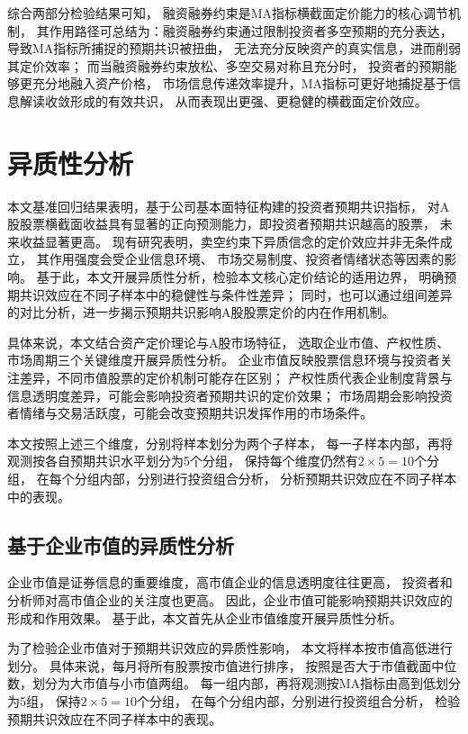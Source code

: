 综合两部分检验结果可知，
融资融券约束是MA指标横截面定价能力的核心调节机制，
其作用路径可总结为：融资融券约束通过限制投资者多空预期的充分表达，
导致MA指标所捕捉的预期共识被扭曲，
无法充分反映资产的真实信息，进而削弱其定价效率；
而当融资融券约束放松、多空交易对称且充分时，
投资者的预期能够更充分地融入资产价格，
市场信息传递效率提升，MA指标可更好地捕捉基于信息解读收敛形成的有效共识，
从而表现出更强、更稳健的横截面定价效应。

 \FloatBarrier

\section{异质性分析}

本文基准回归结果表明，基于公司基本面特征构建的投资者预期共识指标，
对A股股票横截面收益具有显著的正向预测能力，即投资者预期共识越高的股票，
未来收益显著更高。
现有研究表明，卖空约束下异质信念的定价效应并非无条件成立，
其作用强度会受企业信息环境、
市场交易制度、投资者情绪状态等因素的影响\cite{hong2007disagreement}\cite{boehme2006short}。
基于此，本文开展异质性分析，检验本文核心定价结论的适用边界，
明确预期共识效应在不同子样本中的稳健性与条件性差异；
同时，也可以通过组间差异的对比分析，进一步揭示预期共识影响A股股票定价的内在作用机制。

具体来说，本文结合资产定价理论与A股市场特征，
选取企业市值、产权性质、市场周期三个关键维度开展异质性分析。
企业市值反映股票信息环境与投资者关注差异，不同市值股票的定价机制可能存在区别；
产权性质代表企业制度背景与信息透明度差异，可能会影响投资者预期共识的定价效果；
市场周期会影响投资者情绪与交易活跃度，可能会改变预期共识发挥作用的市场条件。

本文按照上述三个维度，分别将样本划分为两个子样本，
每一子样本内部，再将观测按各自预期共识水平划分为5个分组，
保持每个维度仍然有$2 \times 5 = 10$个分组，
在每个分组内部，分别进行投资组合分析，
分析预期共识效应在不同子样本中的表现。

\subsection{基于企业市值的异质性分析}

企业市值是证券信息的重要维度，高市值企业的信息透明度往往更高，
投资者和分析师对高市值企业的关注度也更高。
因此，企业市值可能影响预期共识效应的形成和作用效果。
基于此，本文首先从企业市值维度开展异质性分析。

为了检验企业市值对于预期共识效应的异质性影响，
本文将样本按市值高低进行划分。
具体来说，每月将所有股票按市值进行排序，
按照是否大于市值截面中位数，划分为大市值与小市值两组。
每一组内部，再将观测按MA指标由高到低划分为5组，
保持$2 \times 5 = 10$个分组，
在每个分组内部，分别进行投资组合分析，
检验预期共识效应在不同子样本中的表现。

